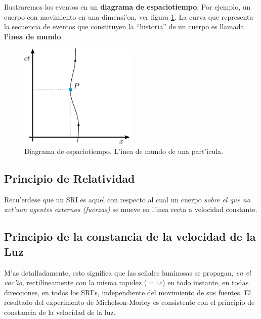 Ilustraremos los eventos en un \textbf{diagrama de espaciotiempo}. Por ejemplo, un cuerpo con movimiento en una dimensi'on, ver figura \ref{TER1}. La curva que representa la secuencia de eventos que constituyen la ``historia'' de un cuerpo es llamada \textbf{l'inea de mundo}.

\begin{figure}[!h]
\centerline{\includegraphics[height=5cm]{fig/fig-diagrama-espaciotiempo.pdf}}
\caption{Diagrama de espaciotiempo. L'inea de mundo de una part'icula.}
\label{TER1}
\end{figure}

\subsection{Principio de Relatividad}
\begin{quotation}
\end{quotation}

Recu'erdese que un SRI es aquel con respecto al cual un cuerpo \textit{sobre el que no act'uan agentes externos (fuerzas)} se mueve en l'inea recta a velocidad
constante.


\subsection{Principio de la constancia de la velocidad de la Luz}
 \begin{quotation}
\end{quotation}
M'as detalladamente, esto significa que las se\~nales luminosas se propagan, \textit{en el vac'io}, rectil\'ineamente con la misma rapidez ($=:c$) en todo instante, en todas direcciones, en todos los SRI's, independiente del movimiento de sus fuentes. El resultado del experimento de Michelson-Morley es consistente con el principio de constancia de la velocidad de la luz.

